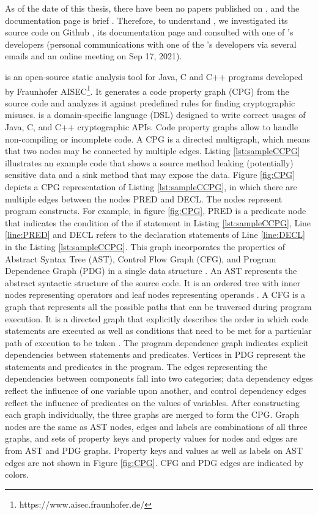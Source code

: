 As of the date of this thesis, there have been no papers published on \codyze{}, and the documentation page is brief \cite{cod}. Therefore, to understand \codyze{}, we investigated its source code on Github \cite{codyzegit}, its documentation page and consulted with one of \codyze's developers (personal communications with one of the \codyze's developers via several emails and an online meeting on Sep 17, 2021).

\codyze{} \cite{cod} is an open-source static analysis tool for Java, C and C++ programs developed by Fraunhofer AISEC\footnote{https://www.aisec.fraunhofer.de/}. It generates a code property graph (CPG) \cite{cpg} from the source code and analyzes it against predefined \MARK{} \cite{cod} rules for finding cryptographic misuses. \MARK{} is a domain-specific language (DSL) designed to write correct usages of Java, C, and C++ cryptographic APIs. Code property graphs allow \codyze{} to handle non-compiling or incomplete code. A CPG is a directed multigraph, which means that two nodes may be connected by multiple edges. Listing \ref{lst:sampleCCPG} illustrates an example code that shows a source method leaking (potentially) sensitive data and a sink method that may expose the data. Figure \ref{fig:CPG} depicts a CPG representation of Listing \ref{lst:sampleCCPG}, in which there are multiple edges between the nodes PRED and DECL. The nodes represent program constructs. For example, in figure \ref{fig:CPG}, PRED is a predicate node that indicates the condition of the if statement in Listing \ref{lst:sampleCCPG}, Line \ref{line:PRED} and DECL refers to the declaration statements of Line \ref{line:DECL} in the Listing \ref{lst:sampleCCPG}.
This graph incorporates the properties of Abstract Syntax Tree (AST), Control Flow Graph (CFG), and Program Dependence Graph (PDG) in a single data structure \cite{cpg}. An AST represents the abstract syntactic structure of the source code. It is an ordered tree with inner nodes representing operators and leaf nodes representing operands \cite{cpg}. A CFG is a graph that represents all the possible paths that can be traversed during program execution. It is a directed graph that explicitly describes the order in which code statements are executed as well as conditions that need to be met for a particular path of execution to be taken \cite{controlflowgraph}. The program dependence graph indicates explicit dependencies between statements and predicates. Vertices in PDG represent the statements and predicates in the program. The edges representing the dependencies between components fall into two categories; data dependency edges reflect the influence of one variable upon another, and control dependency edges reflect the influence of predicates on the values of variables. After constructing each graph individually, the three graphs are merged to form the CPG. Graph nodes are the same as AST nodes, edges and labels are combinations of all three graphs, and sets of property keys and property values for nodes and edges are from AST and PDG graphs. Property keys and values as well as labels on AST edges are not shown in Figure \ref{fig:CPG}. CFG and PDG edges are indicated by colors.


